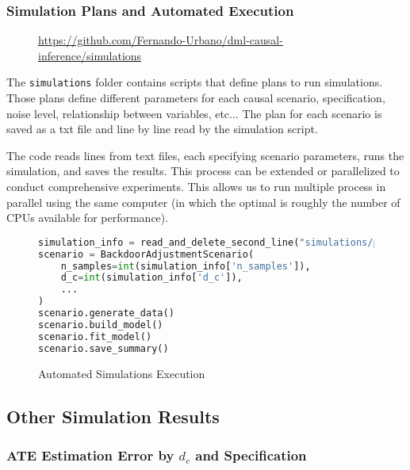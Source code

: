 \documentclass{article}
\numberwithin{equation}{section}
\begin{document}
\subsubsection{Simulation Plans and Automated Execution}

\begin{figure}[H]
    \centering
    \url{https://github.com/Fernando-Urbano/dml-causal-inference/simulations}
\end{figure}

The \texttt{simulations} folder contains scripts that define plans to run simulations. Those plans define different parameters for each causal scenario, specification, noise level, relationship between variables, etc... The plan for each scenario is saved as a txt file and line by line read by the simulation script.

The code reads lines from text files, each specifying scenario parameters, runs the simulation, and saves the results. This process can be extended or parallelized to conduct comprehensive experiments. This allows us to run multiple process in parallel using the same computer (in which the optimal is roughly the number of CPUs available for performance).

\begin{figure}[H]
\begin{lstlisting}[language=python]
simulation_info = read_and_delete_second_line("simulations/plans/backdoor_simulation_plan.txt")
scenario = BackdoorAdjustmentScenario(
    n_samples=int(simulation_info['n_samples']),
    d_c=int(simulation_info['d_c']),
    ...
)
scenario.generate_data()
scenario.build_model()
scenario.fit_model()
scenario.save_summary()
\end{lstlisting}
\caption{Automated Simulations Execution}
\end{figure}

\newpage

\subsection{Other Simulation Results}
\label{subsec:appendix_simulation_results}

\subsubsection{ATE Estimation Error by $d_c$ and Specification}
\end{document}
